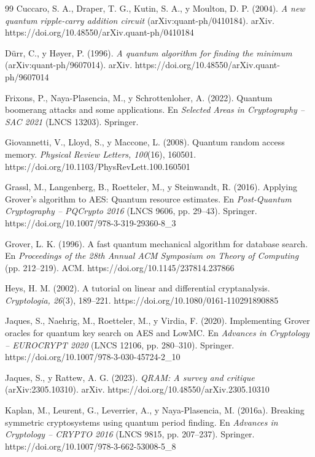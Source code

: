 \begin{thebibliography}{99}
Cuccaro, S. A., Draper, T. G., Kutin, S. A., y Moulton, D. P. (2004). \emph{A new quantum ripple-carry addition circuit} (arXiv:quant-ph/0410184). arXiv. https://doi.org/10.48550/arXiv.quant-ph/0410184

Dürr, C., y Høyer, P. (1996). \emph{A quantum algorithm for finding the minimum} (arXiv:quant-ph/9607014). arXiv. https://doi.org/10.48550/arXiv.quant-ph/9607014

Frixons, P., Naya-Plasencia, M., y Schrottenloher, A. (2022). Quantum boomerang attacks and some applications. En \emph{Selected Areas in Cryptography -- SAC 2021} (LNCS 13203). Springer.

Giovannetti, V., Lloyd, S., y Maccone, L. (2008). Quantum random access memory. \emph{Physical Review Letters, 100}(16), 160501. https://doi.org/10.1103/PhysRevLett.100.160501

Grassl, M., Langenberg, B., Roetteler, M., y Steinwandt, R. (2016). Applying Grover's algorithm to AES: Quantum resource estimates. En \emph{Post-Quantum Cryptography -- PQCrypto 2016} (LNCS 9606, pp. 29--43). Springer. https://doi.org/10.1007/978-3-319-29360-8\_3

Grover, L. K. (1996). A fast quantum mechanical algorithm for database search. En \emph{Proceedings of the 28th Annual ACM Symposium on Theory of Computing} (pp. 212--219). ACM. https://doi.org/10.1145/237814.237866

Heys, H. M. (2002). A tutorial on linear and differential cryptanalysis. \emph{Cryptologia, 26}(3), 189--221. https://doi.org/10.1080/0161-110291890885

Jaques, S., Naehrig, M., Roetteler, M., y Virdia, F. (2020). Implementing Grover oracles for quantum key search on AES and LowMC. En \emph{Advances in Cryptology -- EUROCRYPT 2020} (LNCS 12106, pp. 280--310). Springer. https://doi.org/10.1007/978-3-030-45724-2\_10

Jaques, S., y Rattew, A. G. (2023). \emph{QRAM: A survey and critique} (arXiv:2305.10310). arXiv. https://doi.org/10.48550/arXiv.2305.10310

Kaplan, M., Leurent, G., Leverrier, A., y Naya-Plasencia, M. (2016a). Breaking symmetric cryptosystems using quantum period finding. En \emph{Advances in Cryptology -- CRYPTO 2016} (LNCS 9815, pp. 207--237). Springer. https://doi.org/10.1007/978-3-662-53008-5\_8


\end{thebibliography}
